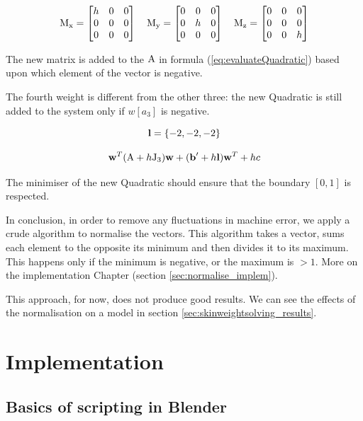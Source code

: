 \documentclass[12pt,twoside]{report}
\begin{document}
\begin{equation*}
\mathrm{M_x}=
    \begin{bmatrix}
    h & 0 & 0 \\
    0 & 0 & 0 \\
    0 & 0 & 0
    \end{bmatrix}
\quad
\mathrm{M_y}=
    \begin{bmatrix}
    0 & 0 & 0 \\
    0 & h & 0 \\
    0 & 0 & 0
    \end{bmatrix}
\quad
\mathrm{M_z}=
    \begin{bmatrix}
    0 & 0 & 0 \\
    0 & 0 & 0 \\
    0 & 0 & h
    \end{bmatrix}
\end{equation*}

The new matrix is added to the $\mathrm{A}$ in formula (\ref{eq:evaluateQuadratic}) based upon which element of the vector is negative.

The fourth weight is different from the other three: the new Quadratic is still added to the system only if $w[a_3]$ is negative.

\[\boldsymbol{ \mathrm{l} }=\{-2, -2, -2\}\]

\[\boldsymbol{ \mathrm{w} }^T (\mathrm{A} + h\mathrm{J}_3) \boldsymbol{ \mathrm{w} } + (\boldsymbol{ \mathrm{b} }' + h\boldsymbol{ \mathrm{l} }) \boldsymbol{ \mathrm{w} }^T + hc
\]

The minimiser of the new Quadratic should ensure that the boundary $[0, 1]$ is respected.

In conclusion, in order to remove any fluctuations in machine error, we apply a crude algorithm to normalise the vectors. This algorithm takes a vector, sums each element to the opposite its minimum and then divides it to its maximum. This happens only if the minimum is negative, or the maximum is $>1$. More on the implementation Chapter (section \ref{sec:normalise_implem}).

This approach, for now, does not produce good results. We can see the effects of the normalisation on a model in section \ref{sec:skinweightsolving_results}.

\chapter{Implementation}
\label{ch:implem}

\section{Basics of scripting in Blender}
\end{document}
